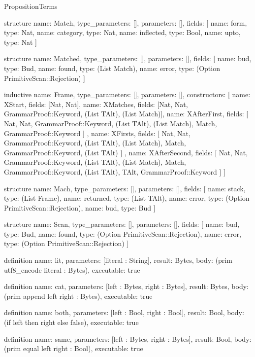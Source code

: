 \begin{lexlean}{PropositionTerms}
\begin{semanticmodule}
structure{
  name: Match,
  type_parameters: [],
  parameters: [],
  fields: [
    {name: form, type: Nat},
    {name: category, type: Nat},
    {name: inflected, type: Bool},
    {name: upto, type: Nat}
  ]
}

structure{
  name: Matched,
  type_parameters: [],
  parameters: [],
  fields: [
    {name: bud, type: Bud},
    {name: found, type: (List Match)},
    {name: error, type: (Option PrimitiveScan::Rejection)}
  ]
}

inductive{
  name: Frame,
  type_parameters: [],
  parameters: [],
  constructors: [
    {name: XStart, fields: [Nat, Nat]},
    {name: XMatches, fields: [Nat, Nat, GrammarProof::Keyword, (List TAlt), (List Match)]},
    {
      name: XAfterFirst,
      fields: [
        Nat,
        Nat,
        GrammarProof::Keyword,
        (List TAlt),
        (List Match),
        Match,
        GrammarProof::Keyword
      ]
    },
    {
      name: XFirsts,
      fields: [
        Nat,
        Nat,
        GrammarProof::Keyword,
        (List TAlt),
        (List Match),
        Match,
        GrammarProof::Keyword,
        (List TAlt)
      ]
    },
    {
      name: XAfterSecond,
      fields: [
        Nat,
        Nat,
        GrammarProof::Keyword,
        (List TAlt),
        (List Match),
        Match,
        GrammarProof::Keyword,
        (List TAlt),
        TAlt,
        GrammarProof::Keyword
      ]
    }
  ]
}

structure{
  name: Mach,
  type_parameters: [],
  parameters: [],
  fields: [
    {name: stack, type: (List Frame)},
    {name: returned, type: (List TAlt)},
    {name: error, type: (Option PrimitiveScan::Rejection)},
    {name: bud, type: Bud}
  ]
}

structure{
  name: Scan,
  type_parameters: [],
  parameters: [],
  fields: [
    {name: bud, type: Bud},
    {name: found, type: (Option PrimitiveScan::Rejection)},
    {name: error, type: (Option PrimitiveScan::Rejection)}
  ]
}

definition{
  name: lit,
  parameters: [literal : String],
  result: Bytes,
  body: (prim utf8_encode literal : Bytes),
  executable: true
}

definition{
  name: cat,
  parameters: [left : Bytes, right : Bytes],
  result: Bytes,
  body: (prim append left right : Bytes),
  executable: true
}

definition{
  name: both,
  parameters: [left : Bool, right : Bool],
  result: Bool,
  body: (if left then right else false),
  executable: true
}

definition{
  name: same,
  parameters: [left : Bytes, right : Bytes],
  result: Bool,
  body: (prim equal left right : Bool),
  executable: true
}


\end{semanticmodule}
\end{lexlean}
